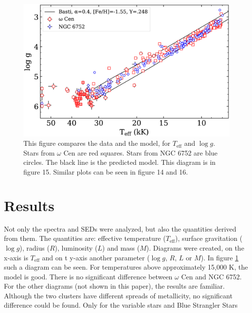 \documentclass{aa}
\begin{document}
\begin{figure}
        \centering
        \includegraphics[width=\hsize]{prediction.png}
        \caption{This figure compares the data and the model, for $T_\text{eff}$ and $\log g$. Stars from $\omega$ Cen are red squares. Stars from NGC 6752 are blue circles. The black line is the predicted model. This diagram is in \cite{2023A&A...677A..86L} figure 15. Similar plots can be seen in figure 14 and 16.}
         \label{fig:prediction}
\end{figure}

\section{Results}
\label{sec:5}
Not only the spectra and SEDs were analyzed, but also the quantities derived from them. The quantities are: effective temperature ($T_\text{eff}$), surface gravitation ($\log g$), radius ($R$), luminosity ($L$) and mass ($M$). Diagrams were created, on the x-axis is $T_\text{eff}$ and on t y-axis another parameter ($\log g$, $R$, $L$ or $M$). In figure \ref{fig:prediction} such a diagram can be seen. For temperatures above approximately 15,000 K, the model is good. There is no significant difference between $\omega$ Cen and NGC 6752. For the other diagrams (not shown in this paper), the results are familiar. 
Although the two clusters have different spreads of metallicity, no significant difference could be found. Only for the variable stars and Blue Strangler Stars

\end{document}
